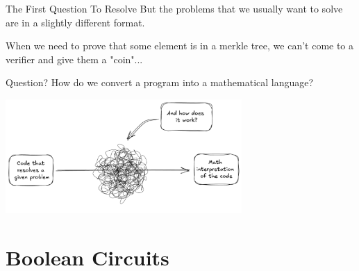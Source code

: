 \documentclass{zkdl-presentation-template}
\begin{document}
    \begin{frame}{The First Question To Resolve}
        But the problems that we usually want to solve are in a slightly different format.
        \pause

        \vspace{0.1cm}
        When we need to prove that some element is in a merkle tree, we can't come
        to a verifier and give them a "coin"...
        
        \pause
        \begin{alertblock}{Question?}
            How do we convert a program into a mathematical language?
        \end{alertblock}

        \center
        \includegraphics[width=9cm]{../presentations/images/lecture_8/exactcodetomathflow.png}
    \end{frame}

    \section{Boolean Circuits}
\end{document}
